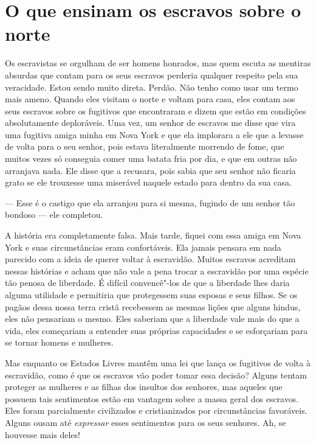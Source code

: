 \chapter*{O que ensinam os escravos sobre o norte}


Os escravistas se orgulham de ser
homens honrados, mas quem escuta as mentiras absurdas que contam para os
seus escravos perderia qualquer respeito pela sua veracidade. Estou
sendo muito direta. Perdão. Não tenho como usar um termo mais ameno.
Quando eles visitam o norte e voltam para casa, eles contam aos seus
escravos sobre os fugitivos que encontraram e dizem que estão em
condições absolutamente deploráveis. Uma vez, um senhor de escravos me
disse que vira uma fugitiva amiga minha em Nova York e que ela implorara
a ele que a levasse de volta para o seu senhor, pois estava literalmente
morrendo de fome, que muitos vezes só conseguia comer uma batata fria
por dia, e que em outras não arranjava nada. Ele disse que a recusara,
pois sabia que seu senhor não ficaria grato se ele trouxesse uma
miserável naquele estado para dentro da sua casa.

--- Esse é o castigo que ela arranjou para si mesma, fugindo de um
senhor tão bondoso --- ele completou.

A história era completamente falsa.
Mais tarde, fiquei com essa amiga em Nova York e suas circunstâncias
eram confortáveis. Ela jamais pensara em nada parecido com a ideia de
querer voltar à escravidão. Muitos escravos acreditam nessas histórias e
acham que não vale a pena trocar a escravidão por uma espécie tão penosa
de liberdade. É difícil convencê"-los de que a liberdade lhes daria
alguma utilidade e permitiria que protegessem suas esposas e seus
filhos. Se os pagãos dessa nossa terra cristã recebessem as mesmas
lições que alguns hindus, eles não pensariam o mesmo. Eles saberiam que
a liberdade vale mais do que a vida, eles começariam a entender suas
próprias capacidades e se esforçariam para se tornar homens e mulheres.

Mas enquanto os Estados Livres mantêm
uma lei que lança os fugitivos de volta à escravidão, como é que os
escravos vão poder tomar essa decisão? Alguns tentam proteger as
mulheres e as filhas dos insultos dos senhores, mas aqueles que possuem
tais sentimentos estão em vantagem sobre a massa geral dos escravos.
Eles foram parcialmente civilizados e cristianizados por circunstâncias
favoráveis. Alguns ousam até \emph{expressar} esses sentimentos para os
seus senhores. Ah, se houvesse mais deles!

